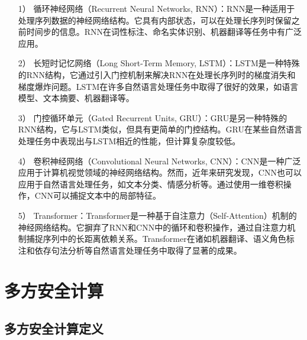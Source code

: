 \begin{itemize}
	\item [1）]
	循环神经网络（Recurrent Neural Networks, RNN）：RNN是一种适用于处理序列数据的神经网络结构。它具有内部状态，可以在处理长序列时保留之前时间步的信息。RNN在词性标注、命名实体识别、机器翻译等任务中有广泛应用。
	\item [2）]
	长短时记忆网络（Long Short-Term Memory, LSTM）：LSTM是一种特殊的RNN结构，它通过引入门控机制来解决RNN在处理长序列时的梯度消失和梯度爆炸问题。LSTM在许多自然语言处理任务中取得了很好的效果，如语言模型、文本摘要、机器翻译等。
	\item [3）]
	门控循环单元（Gated Recurrent Units, GRU）：GRU是另一种特殊的RNN结构，它与LSTM类似，但具有更简单的门控结构。GRU在某些自然语言处理任务中表现出与LSTM相近的性能，但计算复杂度较低。
	\item [4）]
	卷积神经网络（Convolutional Neural Networks, CNN）：CNN是一种广泛应用于计算机视觉领域的神经网络结构。然而，近年来研究发现，CNN也可以应用于自然语言处理任务，如文本分类、情感分析等。通过使用一维卷积操作，CNN可以捕捉文本中的局部特征。
	\item [5）]
	Transformer：Transformer是一种基于自注意力（Self-Attention）机制的神经网络结构。它摒弃了RNN和CNN中的循环和卷积操作，通过自注意力机制捕捉序列中的长距离依赖关系。Transformer在诸如机器翻译、语义角色标注和依存句法分析等自然语言处理任务中取得了显著的成果。
	
\end{itemize}



%

\section{多方安全计算}


\subsection{多方安全计算定义}

